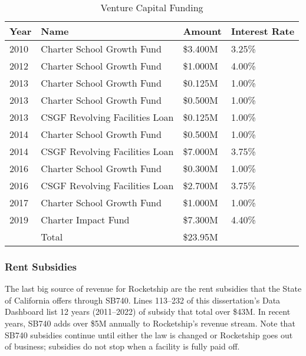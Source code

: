 \begin{table}[ht]
  \SingleSpacing
  \caption{Venture Capital Funding}%
  \label{tab:venture_captial_funding}
  \begin{tabular}{llll}
    \toprule
    Year & Name                           & Amount   & Interest Rate \\
    \midrule
    2010 & Charter School Growth Fund     & \$3.400M & 3.25\%        \\
    2012 & Charter School Growth Fund     & \$1.000M & 4.00\%        \\
    2013 & Charter School Growth Fund     & \$0.125M & 1.00\%        \\
    2013 & Charter School Growth Fund     & \$0.500M & 1.00\%        \\
    2013 & CSGF Revolving Facilities Loan & \$0.125M & 1.00\%        \\
    2014 & Charter School Growth Fund     & \$0.500M & 1.00\%        \\
    2014 & CSGF Revolving Facilities Loan & \$7.000M & 3.75\%        \\
    2016 & Charter School Growth Fund     & \$0.300M & 1.00\%        \\
    2016 & CSGF Revolving Facilities Loan & \$2.700M & 3.75\%        \\
    2017 & Charter School Growth Fund     & \$1.000M & 1.00\%        \\
    2019 & Charter Impact Fund            & \$7.300M & 4.40\%        \\
    \midrule
         & Total                          & \$23.95M &               \\
    \bottomrule
  \end{tabular}
\end{table}

\subsubsection{Rent Subsidies}%
\label{sec:rent-subsidies}\indent%

The last big source of revenue for Rocketship are the rent subsidies that the State of California offers through SB740. Lines 113–232 of this dissertation's Data Dashboard list 12 years (2011–2022) of subsidy that total over \$43M. In recent years, SB740 adds over \$5M annually to Rocketship's revenue stream. Note that SB740 subsidies continue until either the law is changed or Rocketship goes out of business; subsidies do not stop when a facility is fully paid off.

